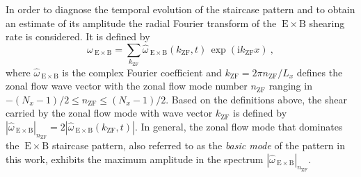 \documentclass[aip, amsmath, amssymb, reprint, twocolumn, floatfix]{revtex4-1}
\newcommand{\wexb}{\omega_{\mathrm{\:E \times B}}}
\newcommand{\hatwexb}{\widehat{\omega}_{\mathrm{\:E \times B}}}
\newcommand{\exb}{\mathrm{\:E}\times\mathrm{B}}
\newcommand{\hatwexbamp}{|\hatwexb|_{\nzf}}
\newcommand{\nzf}{n_\mathrm{ZF}}
\newcommand{\kzf}{k_\mathrm{ZF}}
\newcommand{\xcoord}{x}
\begin{document}
\newpage
In order to diagnose the temporal evolution of the staircase pattern and to obtain an estimate of its amplitude the radial Fourier transform of the $\exb$ shearing rate is considered. 
It is defined by
\begin{equation}
	\wexb = \sum_{\kzf} \hatwexb(\kzf,t) \, \exp(\mathrm{i} \kzf \xcoord)~,
	\label{eq:shearingrate_fourier}
\end{equation}
where $\hatwexb$ is the complex Fourier coefficient and \linebreak $\kzf = 2\pi \nzf/L_\xcoord$
defines the zonal flow wave vector with the zonal flow mode number $\nzf$ ranging in $-(N_\xcoord -1)/2 \leq \nzf \leq (N_\xcoord -1)/2 $.
Based on the definitions above, the shear carried by the zonal flow mode with wave vector $\kzf$ is defined by $\hatwexbamp = 2 |\hatwexb(\kzf,t)|$. 
In general, the zonal flow mode that dominates the $\exb$ staircase pattern, also referred to as the \textit{basic mode} of the pattern in this work, exhibits the maximum amplitude in the spectrum $\hatwexbamp$.\bigskip

\end{document}
